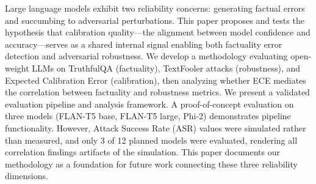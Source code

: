 
Large language models exhibit two reliability concerns: generating factual errors and succumbing to adversarial perturbations. This paper proposes and tests the hypothesis that calibration quality---the alignment between model confidence and accuracy---serves as a shared internal signal enabling both factuality error detection and adversarial robustness. We develop a methodology evaluating open-weight LLMs on TruthfulQA (factuality), TextFooler attacks (robustness), and Expected Calibration Error (calibration), then analyzing whether ECE mediates the correlation between factuality and robustness metrics. We present a validated evaluation pipeline and analysis framework. A proof-of-concept evaluation on three models (FLAN-T5 base, FLAN-T5 large, Phi-2) demonstrates pipeline functionality. However, Attack Success Rate (ASR) values were simulated rather than measured, and only 3 of 12 planned models were evaluated, rendering all correlation findings artifacts of the simulation. This paper documents our methodology as a foundation for future work connecting these three reliability dimensions.

